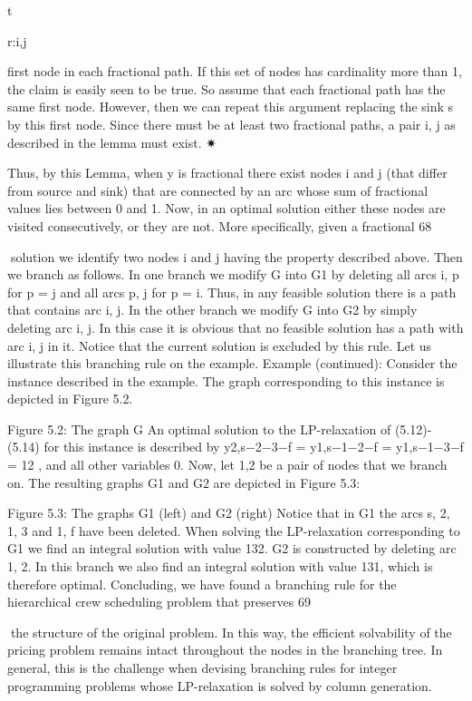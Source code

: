 t

r:{i,j}

first node in each fractional path. If this set of nodes has cardinality more than 1, the claim is easily seen
to be true. So assume that each fractional path has the same first node. However, then we can repeat
this argument replacing the sink s by this first node. Since there must be at least two fractional paths,
a pair i, j as described in the lemma must exist.
✷

Thus, by this Lemma, when y is fractional there exist nodes i and j (that differ from source and sink)
that are connected by an arc whose sum of fractional values lies between 0 and 1. Now, in an optimal
solution either these nodes are visited consecutively, or they are not. More specifically, given a fractional
68

solution we identify two nodes i and j having the property described above. Then we branch as follows.
In one branch we modify G into G1 by deleting all arcs {i, p} for p = j and all arcs {p, j} for p = i. Thus,
in any feasible solution there is a path that contains arc {i, j}. In the other branch we modify G into G2
by simply deleting arc {i, j}. In this case it is obvious that no feasible solution has a path with arc {i, j}
in it. Notice that the current solution is excluded by this rule. Let us illustrate this branching rule on
the example.
Example (continued): Consider the instance described in the example. The graph corresponding to
this instance is depicted in Figure 5.2.

Figure 5.2: The graph G
An optimal solution to the LP-relaxation of (5.12)-(5.14) for this instance is described by y2,s−2−3−f =
y1,s−1−2−f = y1,s−1−3−f = 12 , and all other variables 0. Now, let 1,2 be a pair of nodes that we branch
on. The resulting graphs G1 and G2 are depicted in Figure 5.3:



Figure 5.3: The graphs G1 (left) and G2 (right)
Notice that in G1 the arcs {s, 2}, {1, 3} and {1, f } have been deleted. When solving the LP-relaxation
corresponding to G1 we find an integral solution with value 132. G2 is constructed by deleting arc {1, 2}.
In this branch we also find an integral solution with value 131, which is therefore optimal.
Concluding, we have found a branching rule for the hierarchical crew scheduling problem that preserves
69

the structure of the original problem. In this way, the efficient solvability of the pricing problem remains
intact throughout the nodes in the branching tree. In general, this is the challenge when devising
branching rules for integer programming problems whose LP-relaxation is solved by column generation.

